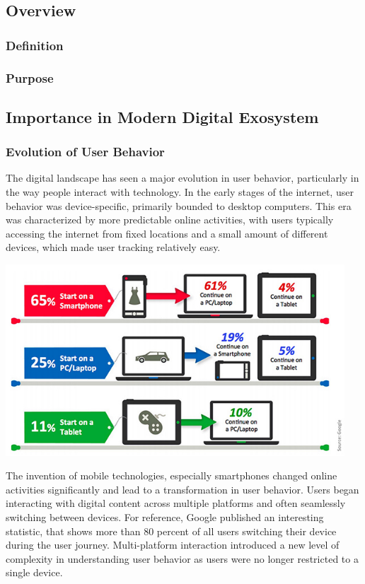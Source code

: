 \subsection{Overview}
\subsubsection{Definition}
\subsubsection{Purpose}
\subsection{Importance in Modern Digital Exosystem}

\subsubsection{Evolution of User Behavior}
The digital landscape has seen a major evolution in user behavior, particularly in the way people interact with technology. In the early stages of the internet, user behavior was device-specific, primarily bounded to desktop computers. This era was characterized by more predictable online activities, with users typically accessing the internet from fixed locations and a small amount of different devices, which made user tracking relatively easy.

\includegraphics[width=0.95\textwidth]{./assets/google-cdt-stats.jpeg}

The invention of mobile technologies, especially smartphones changed online activities significantly and lead to a transformation in user behavior. Users began interacting with digital content across multiple platforms and often seamlessly switching between devices. For reference, Google published an interesting statistic, that shows more than 80 percent of all users switching their device during the user journey. Multi-platform interaction introduced a new level of complexity in understanding user behavior as users were no longer restricted to a single device.

